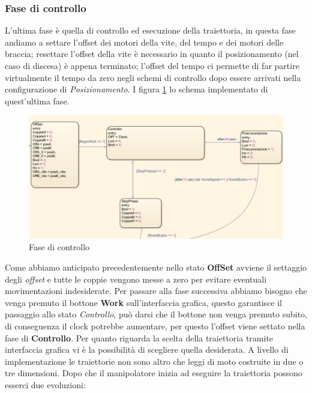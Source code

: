 \subsubsection{Fase di controllo}
L'ultima fase è quella di controllo ed esecuzione della traiettoria, in questa fase andiamo a settare l'offset dei motori della vite, del tempo e dei motori delle braccia; resettare l'offset della vite è necessario in quanto il posizionamento (nel caso di discesa) è appena terminato; l'offset del tempo ci permette di far partire virtualmente il tempo da zero negli schemi di controllo dopo essere arrivati nella configurazione di \textit{Posizionamento}. I figura \ref{fig:Traiettoria} lo schema implementato di quest'ultima fase.
\begin{figure}[ht]
\begin{center}
    \includegraphics[scale=0.6]{Immagini/Sperimentale/state3New.png}
    \caption{Fase di controllo}
    \label{fig:Traiettoria}
\end{center}
\end{figure}
\par Come abbiamo anticipato precedentemente nello stato \textbf{OffSet} avviene il settaggio degli \textit{offset} e tutte le coppie vengono messe a zero per evitare eventuali movimentazioni indesiderate. Per passare alla fase successiva abbiamo bisogno che venga premuto il bottone \textbf{Work} sull'interfaccia grafica, questo garantisce il passaggio allo stato \textit{Controllo}, può darsi che il bottone non venga premuto subito, di conseguenza il clock potrebbe aumentare, per questo l'offset viene settato nella fase di \textbf{Controllo}. Per quanto riguarda la scelta della traiettoria tramite interfaccia grafica vi è la possibilità di scegliere quella desiderata. A livello di implementazione le traiettorie non sono altro che leggi di moto costruite in due o tre dimensioni. Dopo che il manipolatore inizia ad eseguire la traiettoria possono esserci due evoluzioni:
